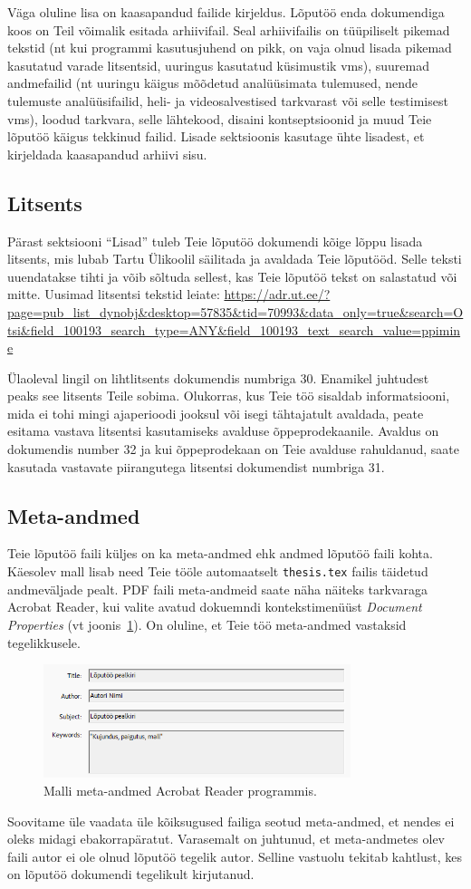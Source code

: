 Väga oluline lisa on kaasapandud failide kirjeldus. Lõputöö enda dokumendiga koos on Teil võimalik esitada arhiivifail. Seal arhiivifailis on tüüpiliselt pikemad tekstid (nt kui programmi kasutusjuhend on pikk, on vaja olnud lisada pikemad kasutatud varade litsentsid, uuringus kasutatud küsimustik vms), suuremad andmefailid (nt uuringu käigus mõõdetud analüüsimata tulemused, nende tulemuste analüüsifailid, heli- ja videosalvestised tarkvarast või selle testimisest vms), loodud tarkvara, selle lähtekood, disaini kontseptsioonid ja muud Teie lõputöö käigus tekkinud failid. Lisade sektsioonis kasutage ühte lisadest, et kirjeldada kaasapandud arhiivi sisu.

\subsection{Litsents} \label{subchapter:litsents}
Pärast sektsiooni “Lisad” tuleb Teie lõputöö dokumendi kõige lõppu lisada litsents, mis lubab Tartu Ülikoolil säilitada ja avaldada Teie lõputööd. Selle teksti uuendatakse tihti ja võib sõltuda sellest, kas Teie lõputöö tekst on salastatud või mitte. Uusimad litsentsi tekstid leiate: \url{https://adr.ut.ee/?page=pub_list_dynobj&desktop=57835&tid=70993&data_only=true&search=Otsi&field_100193_search_type=ANY&field_100193_text_search_value=ppimine}

Ülaoleval lingil on lihtlitsents dokumendis numbriga 30. Enamikel juhtudest peaks see litsents Teile sobima. Olukorras, kus Teie töö sisaldab informatsiooni, mida ei tohi mingi ajaperioodi jooksul või isegi tähtajatult avaldada, peate esitama vastava litsentsi kasutamiseks avalduse õppeprodekaanile. Avaldus on dokumendis number 32 ja kui õppeprodekaan on Teie avalduse rahuldanud, saate kasutada vastavate piirangutega litsentsi dokumendist numbriga 31.

\subsection{Meta-andmed}
Teie lõputöö faili küljes on ka meta-andmed ehk andmed lõputöö faili kohta. Käesolev mall lisab need Teie tööle automaatselt \verb|thesis.tex| failis täidetud andmeväljade pealt. PDF faili meta-andmeid saate näha näiteks tarkvaraga Acrobat Reader, kui valite avatud dokuemndi kontekstimenüüst \emph{Document Properties} (vt joonis~\ref{fig:metaAndmed}). On oluline, et Teie töö meta-andmed vastaksid tegelikkusele.

\begin{figure}[ht]
    \centering
    \includegraphics[width=0.8\textwidth]{figures/Joonis4-MetaAndmed.png}
    \caption{Malli meta-andmed Acrobat Reader programmis.}
    \label{fig:metaAndmed}
\end{figure}

Soovitame üle vaadata üle kõiksugused failiga seotud meta-andmed, et nendes ei oleks midagi ebakorrapäratut. Varasemalt on juhtunud, et meta-andmetes olev faili autor ei ole olnud lõputöö tegelik autor. Selline vastuolu tekitab kahtlust, kes on lõputöö dokumendi tegelikult kirjutanud.

